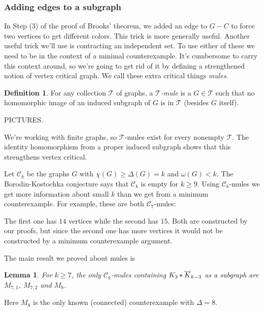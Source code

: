 \documentclass[12pt]{article}
\theoremstyle{plain}
\newtheorem{lem}[thm]{Lemma}
\theoremstyle{definition}
\newtheorem{defn}{Definition}
\theoremstyle{remark}
\newcommand{\fancy}[1]{\mathcal{#1}}
\newcommand{\join}[2]{#1 \mbox{\hspace{2 pt}$\ast$\hspace{2 pt}} #2}
\begin{document}
\subsubsection{Adding edges to a subgraph}
In Step (3) of the proof of Brooks' theorem, we added an edge to $G-C$ to force two vertices to get different colors.  This trick is more generally useful.   Another useful trick we'll use is contracting an independent set. To use either of these we need to be in the context of a minimal counterexample.  It's cumbersome to carry this context around, so we're going to get rid of it by defining a strengthened notion of vertex critical graph.  We call these extra critical things \emph{mules}.

\begin{defn}
For any collection $\fancy{T}$ of graphs, a \emph{$\fancy{T}$-mule} is a $G \in \fancy{T}$ such that no homomorphic image of an induced subgraph of $G$ is in $\fancy{T}$ (besides $G$ itself).
\end{defn}

PICTURES.\bigskip

We're working with finite graphs, so $\fancy{T}$-mules exist for every nonempty $\fancy{T}$.  The identity homomorphism from a proper induced subgraph shows that this strengthens vertex critical. 

\bigskip

Let $\fancy{C}_k$ be the graphs $G$ with $\chi(G) \geq \Delta(G) = k$ and $\omega(G) < k$.  The Borodin-Kostochka conjecture says that $\fancy{C}_k$ is empty for $k \geq 9$. Using $\fancy{C}_k$-mules we get more information about small $k$ than we get from a minimum counterexample.  For example, these are both $\fancy{C}_7$-mules:




The first one has $14$ vertices while the second has $15$. Both are constructed by our proofs, but since the second one has more vertices it would not be constructed by a minimum counterexample argument.

\bigskip

The main result we proved about mules is

\begin{lem}\label{K3sOut}
For $k \geq 7$, the only $\fancy{C}_k$-mules containing $\join{K_3}{\overline{K}_{k-3}}$
as a subgraph are $M_{7,1}$,  $M_{7,2}$ and $M_8$.
\end{lem}

Here $M_8$ is the only known (connected) counterexample with $\Delta=8$.
\end{document}
